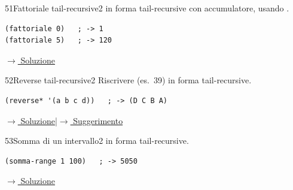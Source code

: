 \bigskip

\label{ex:51}
\begin{essbox}{51}{Fattoriale tail-recursive}{2}
  in forma tail-recursive
con accumulatore, usando .
\begin{lstlisting}
(fattoriale 0)   ; -> 1
(fattoriale 5)   ; -> 120
\end{lstlisting}

\small\color{black!55}\hyperref[sol:51]{$\rightarrow$ Soluzione}\normalsize\color{black}
\end{essbox}

\label{ex:52}
\begin{stdbox}{52}{Reverse tail-recursive}{2}
Riscrivere  (es.~39) in forma tail-recursive.
\begin{lstlisting}
(reverse* '(a b c d))   ; -> (D C B A)
\end{lstlisting}

\small\color{black!55}\hyperref[sol:52]{$\rightarrow$ Soluzione}\enspace\textcolor{black!30}{|}\enspace\hyperref[hint:52]{$\rightarrow$ Suggerimento}\normalsize\color{black}
\end{stdbox}

\label{ex:53}
\begin{colbox}{53}{Somma di un intervallo}{2}
  in forma tail-recursive.
\begin{lstlisting}
(somma-range 1 100)   ; -> 5050
\end{lstlisting}

\small\color{black!55}\hyperref[sol:53]{$\rightarrow$ Soluzione}\normalsize\color{black}
\end{colbox}

